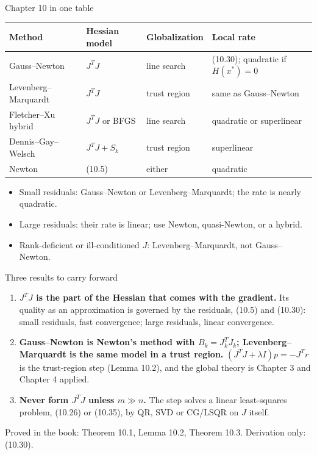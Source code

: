 \documentclass[aspectratio=169,12pt]{beamer}
\newcommand{\xs}{x^{*}}
\begin{document}
\begin{frame}{Chapter 10 in one table}
  \begin{center}
  \small\setlength\tabcolsep{5pt}
  \begin{tabular}{llll}
    \toprule
    Method & Hessian model & Globalization & Local rate \\
    \midrule
    Gauss--Newton & $J^{T}J$ & line search & (10.30); quadratic if $H(\xs)=0$ \\
    Levenberg--Marquardt & $J^{T}J$ & trust region & same as Gauss--Newton \\
    Fletcher--Xu hybrid & $J^{T}J$ or BFGS & line search & quadratic or superlinear \\
    Dennis--Gay--Welsch & $J^{T}J+S_{k}$ & trust region & superlinear \\
    Newton & (10.5) & either & quadratic \\
    \bottomrule
  \end{tabular}
  \end{center}

  \vspace{0.4em}
  \begin{itemize}\setlength\itemsep{0.4em}
    \item Small residuals: Gauss--Newton or Levenberg--Marquardt; the rate is nearly quadratic.
    \item Large residuals: their rate is linear; use Newton, quasi-Newton, or a hybrid.
    \item Rank-deficient or ill-conditioned $J$: Levenberg--Marquardt, not Gauss--Newton.
  \end{itemize}
\end{frame}

\begin{frame}{Three results to carry forward}
  \begin{enumerate}\setlength\itemsep{0.7em}
    \item \textbf{$J^{T}J$ is the part of the Hessian that comes with the gradient.} Its quality as an
      approximation is governed by the residuals, (10.5) and (10.30): small residuals, fast
      convergence; large residuals, linear convergence.
    \item \textbf{Gauss--Newton is Newton's method with $B_{k}=J_{k}^{T}J_{k}$; Levenberg--Marquardt is
      the same model in a trust region.} $(J^{T}J+\lambda I)p=-J^{T}r$ is the trust-region step
      (Lemma 10.2), and the global theory is Chapter 3 and Chapter 4 applied.
    \item \textbf{Never form $J^{T}J$ unless $m\gg n$.} The step solves a linear least-squares problem,
      (10.26) or (10.35), by QR, SVD or CG/LSQR on $J$ itself.
  \end{enumerate}

  \vspace{0.6em}
  Proved in the book: Theorem 10.1, Lemma 10.2, Theorem 10.3. Derivation only: (10.30).
\end{frame}
\end{document}

